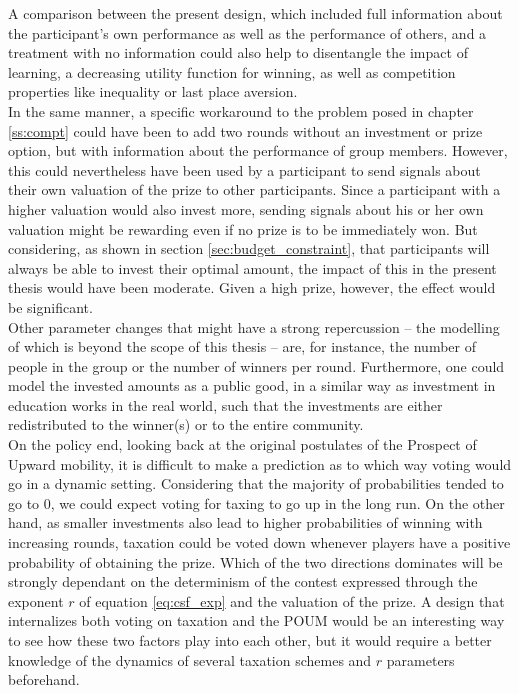 A comparison between the present design, which included full information about the participant's own performance as well as the performance of others, and a treatment with no information could also help to disentangle the impact of learning, a decreasing utility function for winning, as well as competition properties like inequality or last place aversion.\\

In the same manner, a specific workaround to the problem posed in chapter \ref{ss:compt} could have been to add two rounds without an investment or prize option, but with information about the performance of group members. However, this could nevertheless have been used by a participant to send signals about their own valuation of the prize to other participants. Since a participant with a higher valuation would also invest more, sending signals about his or her own valuation might be rewarding even if no prize is to be immediately won. But considering, as shown in section \ref{sec:budget_constraint}, that participants will always be able to invest their optimal amount, the impact of this in the present thesis would have been moderate. Given a high prize, however, the effect would be significant.\\

Other parameter changes that might have a strong repercussion -- the modelling of which is beyond the scope of this thesis -- are, for instance, the number of people in the group or the number of winners per round. Furthermore, one could model the invested amounts as a public good, in a similar way as investment in education works in the real world, such that the investments are either redistributed to the winner(s) or to the entire community.\\

On the policy end, looking back at the original postulates of the Prospect of Upward mobility, it is difficult to make a prediction as to which way voting would go in a dynamic setting. Considering that the majority of probabilities tended to go to 0, we could expect voting for taxing to go up in the long run. On the other hand, as smaller investments also lead to higher probabilities of winning with increasing rounds, taxation could be voted down whenever players have a positive probability of obtaining the prize. Which of the two directions dominates will be strongly dependant on the determinism of the contest expressed through the exponent $r$ of equation \ref{eq:csf_exp} and the valuation of the prize. A design that internalizes both voting on taxation and the POUM would be an interesting way to see how these two factors play into each other, but it would require a better knowledge of the dynamics of several taxation schemes and $r$ parameters beforehand.\\


